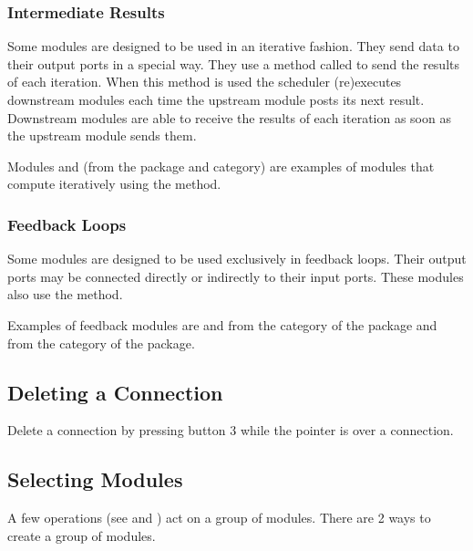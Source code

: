 \subsubsection{Intermediate Results}

Some modules are designed to be used in an iterative fashion.  They send
data to their output ports in a special way.  They use a method called
 to send the results of each iteration.  When
this method is used the scheduler (re)executes downstream modules each time
the upstream module posts its next result.  Downstream modules are
able to receive the results of each iteration as soon as the
upstream module sends them.

Modules  and  (from the
\package{\sr} package and  category) are examples of modules
that compute iteratively using the  method.

\subsubsection{Feedback Loops}

Some modules are designed to be used exclusively in feedback loops. Their output ports may be connected
directly or indirectly to their input ports.  These modules also use the
 method.

Examples of feedback modules are  and
 from the  category of the
 package and  from the
 category of the  package.

\subsection{Deleting a Connection}
\label{sec:deleteconnections}

Delete a connection by pressing button 3 while the pointer is
over a connection.

\subsection{Selecting Modules}
\label{sec:selectmods}

A few operations (see  and
) act on a group of
modules.  There are 2 ways to create a group of modules.

